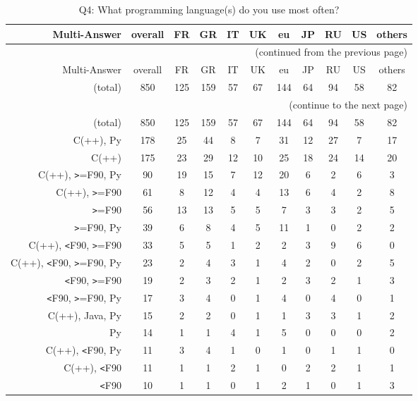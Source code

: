 \clearpage%
{\footnotesize\begin{landscape}%
\begin{longtable}[htb]{r|c|c|c|c|c|c|c|c|c|c}%
\caption{Q4: What programming language(s) do you use most often?}%
\label{tab:Q4-mans} \\%
\hline%
Multi-Answer & overall & FR & GR & IT & UK & eu & JP & RU & US & others \\
 \hline%
\endfirsthead%
\multicolumn{11}{r}{(continued from the previous page)}\\%
\hline%
Multi-Answer & overall & FR & GR & IT & UK & eu & JP & RU & US & others \\
 \hline%
\endhead%
\hline%
(total) & 850 & 125 & 159 & 57 & 67 & 144 & 64 & 94 & 58 & 82 \\%
\hline%
\multicolumn{11}{r}{(continue to the next page)}\\%
\endfoot%
\hline%
(total) & 850 & 125 & 159 & 57 & 67 & 144 & 64 & 94 & 58 & 82 \\%
\hline%
\endlastfoot%
\hline%
{C(++), Py} & 178 & 25 & 44 & 8 & 7 & 31 & 12 & 27 & 7 & 17 \\%
{C(++)} & 175 & 23 & 29 & 12 & 10 & 25 & 18 & 24 & 14 & 20 \\%
{C(++), \verb!>!=F90, Py} & 90 & 19 & 15 & 7 & 12 & 20 & 6 & 2 & 6 & 3 \\%
{C(++), \verb!>!=F90} & 61 & 8 & 12 & 4 & 4 & 13 & 6 & 4 & 2 & 8 \\%
{\verb!>!=F90} & 56 & 13 & 13 & 5 & 5 & 7 & 3 & 3 & 2 & 5 \\%
{\verb!>!=F90, Py} & 39 & 6 & 8 & 4 & 5 & 11 & 1 & 0 & 2 & 2 \\%
{C(++), \verb!<!F90, \verb!>!=F90} & 33 & 5 & 5 & 1 & 2 & 2 & 3 & 9 & 6 & 0 \\%
{C(++), \verb!<!F90, \verb!>!=F90, Py} & 23 & 2 & 4 & 3 & 1 & 4 & 2 & 0 & 2 & 5 \\%
{\verb!<!F90, \verb!>!=F90} & 19 & 2 & 3 & 2 & 1 & 2 & 3 & 2 & 1 & 3 \\%
{\verb!<!F90, \verb!>!=F90, Py} & 17 & 3 & 4 & 0 & 1 & 4 & 0 & 4 & 0 & 1 \\%
{C(++), Java, Py} & 15 & 2 & 2 & 0 & 1 & 1 & 3 & 3 & 1 & 2 \\%
{Py} & 14 & 1 & 1 & 4 & 1 & 5 & 0 & 0 & 0 & 2 \\%
{C(++), \verb!<!F90, Py} & 11 & 3 & 4 & 1 & 0 & 1 & 0 & 1 & 1 & 0 \\%
{C(++), \verb!<!F90} & 11 & 1 & 1 & 2 & 1 & 0 & 2 & 2 & 1 & 1 \\%
{\verb!<!F90} & 10 & 1 & 1 & 0 & 1 & 2 & 1 & 0 & 1 & 3 \\%

\end{longtable}
\end{landscape}}
